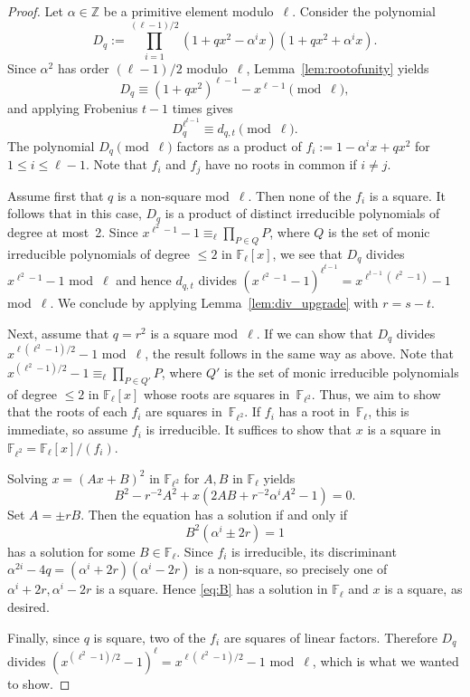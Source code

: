 \documentclass[10pt]{article}
\theoremstyle{definition}
\renewcommand{\:}{\colon}
\newcommand{\bF}{\mathbb{F}}
\begin{document}
\begin{proof}
    Let $\alpha \in \mathbb Z$ be a primitive element modulo~$\ell$. Consider the polynomial
    \[
    D_q := \prod_{i=1}^{(\ell-1)/2} (1 + qx^2 - \alpha^i x)(1 + qx^2 + \alpha^i x).
    \]
    Since $\alpha^2$ has order $(\ell-1)/2$ modulo~$\ell$, Lemma~\ref{lem:rootofunity}  yields
    \[
    D_q \equiv (1 + qx^2)^{\ell-1} - x^{\ell-1} \pmod{\ell},
    \]
    and applying Frobenius $t-1$ times gives
    \[
    D_q^{\ell^{t-1}} \equiv d_{q,t} \pmod{\ell}.
    \]
    The polynomial $D_q \pmod{\ell}$ factors as a product of $f_i := 1 - \alpha^i x + qx^2$ for $1 \leq i \leq \ell-1$. Note that $f_i$ and $f_j$ have no roots in common if $i \neq j$.
    
    Assume first that $q$ is a non-square mod~$\ell$. Then none of the $f_i$ is a square. It follows that in this case, $D_q$ is a product of distinct irreducible polynomials of degree at most~2. Since $x^{\ell^2-1}-1 \equiv_{\ell} \prod_{P \in Q} P$, where $Q$ is the set of monic irreducible polynomials of degree $\leq 2$ in $\mathbb F_{\ell}[x]$, we see that $D_q$ divides $x^{\ell^2-1}-1$ mod~$\ell$ and hence $d_{q,t}$ divides $(x^{\ell^2-1}-1)^{\ell^{t-1}} = x^{\ell^{t-1}(\ell^2-1)}-1$ mod~$\ell$.
    We conclude by applying Lemma~\ref{lem:div_upgrade} with $r=s-t$.
    
    Next, assume that $q = r^2$ is a square mod~$\ell$. If we can show that $D_q$ divides $x^{\ell(\ell^2-1)/2}-1$ mod~$\ell$, the result follows in the same way as above. Note that $x^{(\ell^2-1)/2}-1 \equiv_{\ell} \prod_{P \in Q'} P$, where $Q'$ is the set of monic irreducible polynomials of degree $\leq 2$ in $\bF_{\ell}[x]$ whose roots are squares in~$\bF_{\ell^2}$. Thus, we aim to show that the roots of each $f_i$ are squares in~$\bF_{\ell^2}$. If $f_i$ has a root in~$\bF_{\ell}$, this is immediate, so assume $f_i$ is irreducible. It suffices to show that $x$ is a square in $\bF_{\ell^2} = \bF_{\ell}[x]/(f_i)$.

    Solving $x = (Ax + B)^2$ in $\bF_{\ell^2}$ for $A,B$ in $\bF_{\ell}$ yields
    \[
    B^2 - r^{-2}A^2 + x(2AB+r^{-2}\alpha^i A^2-1) = 0.
    \]
    Set $A = \pm rB$. Then the equation has a solution if and only if
    \begin{equation}\label{eq:B}
    B^2(\alpha^i \pm 2r) = 1
    \end{equation}
    has a solution for some $B \in \bF_{\ell}$. Since $f_i$ is irreducible, its discriminant $\alpha^{2i}-4q = (\alpha^i + 2r)(\alpha^i - 2r)$ is a non-square, so precisely one of $\alpha^i + 2r, \alpha^i - 2r$ is a square. Hence \eqref{eq:B} has a solution in $\bF_{\ell}$ and $x$ is a square, as desired.

    Finally, since $q$ is square, two of the $f_i$ are squares of linear factors. Therefore $D_q$ divides $(x^{(\ell^2-1)/2}-1)^{\ell} = x^{\ell(\ell^2-1)/2}-1$ mod~$\ell$, which is what we wanted to show.
\end{proof}
\end{document}
